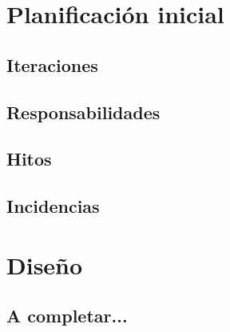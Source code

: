 \documentclass[a4paper,openright,12pt]{article}
\begin{document}
\section{Planificación inicial}

\subsection{Iteraciones}

\subsection{Responsabilidades}

\subsection{Hitos}

\subsection{Incidencias}


\section{Diseño}

\subsection{A completar...}








\end{document}
